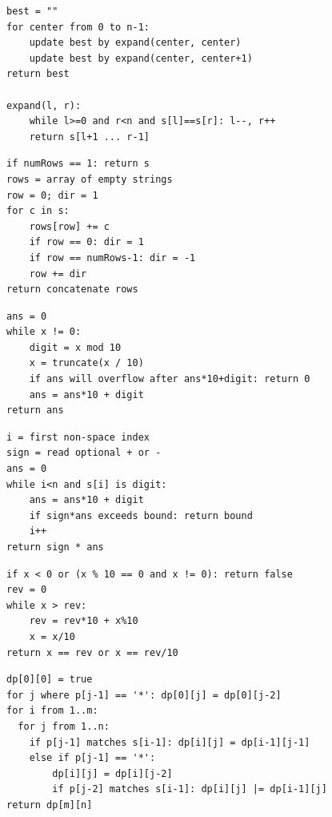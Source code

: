 \documentclass[11pt,a4paper]{ctexart}
\begin{document}
\begin{verbatim}
best = ""
for center from 0 to n-1:
    update best by expand(center, center)
    update best by expand(center, center+1)
return best

expand(l, r):
    while l>=0 and r<n and s[l]==s[r]: l--, r++
    return s[l+1 ... r-1]
\end{verbatim}

\begin{verbatim}
if numRows == 1: return s
rows = array of empty strings
row = 0; dir = 1
for c in s:
    rows[row] += c
    if row == 0: dir = 1
    if row == numRows-1: dir = -1
    row += dir
return concatenate rows
\end{verbatim}

\begin{verbatim}
ans = 0
while x != 0:
    digit = x mod 10
    x = truncate(x / 10)
    if ans will overflow after ans*10+digit: return 0
    ans = ans*10 + digit
return ans
\end{verbatim}

\begin{verbatim}
i = first non-space index
sign = read optional + or -
ans = 0
while i<n and s[i] is digit:
    ans = ans*10 + digit
    if sign*ans exceeds bound: return bound
    i++
return sign * ans
\end{verbatim}

\begin{verbatim}
if x < 0 or (x % 10 == 0 and x != 0): return false
rev = 0
while x > rev:
    rev = rev*10 + x%10
    x = x/10
return x == rev or x == rev/10
\end{verbatim}

\begin{verbatim}
dp[0][0] = true
for j where p[j-1] == '*': dp[0][j] = dp[0][j-2]
for i from 1..m:
  for j from 1..n:
    if p[j-1] matches s[i-1]: dp[i][j] = dp[i-1][j-1]
    else if p[j-1] == '*':
        dp[i][j] = dp[i][j-2]
        if p[j-2] matches s[i-1]: dp[i][j] |= dp[i-1][j]
return dp[m][n]
\end{verbatim}
\end{document}
